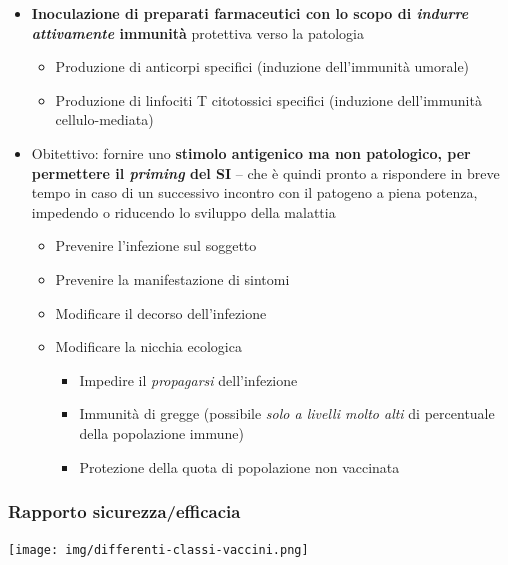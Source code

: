 \documentclass[italian,]{article}
\providecommand{\tightlist}{%
  \setlength{\itemsep}{0pt}\setlength{\parskip}{0pt}}
\begin{document}
\begin{itemize}
\tightlist
\item
  \textbf{Inoculazione di preparati farmaceutici con lo scopo di
  \emph{indurre attivamente} immunità} protettiva verso la patologia

  \begin{itemize}
  \tightlist
  \item
    Produzione di anticorpi specifici (induzione dell'immunità umorale)
  \item
    Produzione di linfociti T citotossici specifici (induzione
    dell'immunità cellulo-mediata)
  \end{itemize}
\item
  Obitettivo: fornire uno \textbf{stimolo antigenico ma non patologico,
  per permettere il \emph{priming} del SI} -- che è quindi pronto a
  rispondere in breve tempo in caso di un successivo incontro con il
  patogeno a piena potenza, impedendo o riducendo lo sviluppo della
  malattia

  \begin{itemize}
  \tightlist
  \item
    Prevenire l'infezione sul soggetto
  \item
    Prevenire la manifestazione di sintomi
  \item
    Modificare il decorso dell'infezione
  \item
    Modificare la nicchia ecologica

    \begin{itemize}
    \tightlist
    \item
      Impedire il \emph{propagarsi} dell'infezione
    \item
      Immunità di gregge (possibile \emph{solo a livelli molto alti} di
      percentuale della popolazione immune)
    \item
      Protezione della quota di popolazione non vaccinata
    \end{itemize}
  \end{itemize}
\end{itemize}

\hypertarget{rapporto-sicurezzaefficacia}{%
\subsubsection{Rapporto
sicurezza/efficacia}\label{rapporto-sicurezzaefficacia}}

\texttt{[image: img/differenti-classi-vaccini.png]}~
\end{document}
